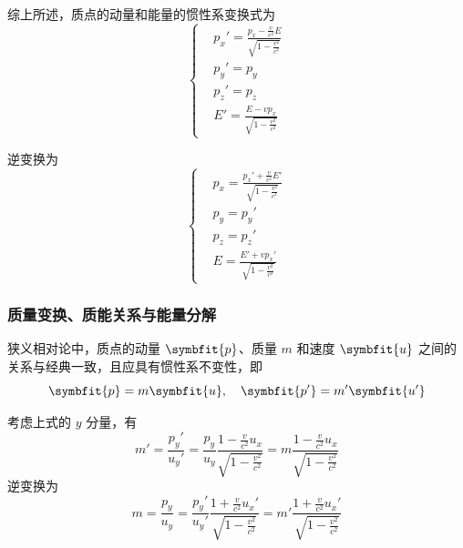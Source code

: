 综上所述，质点的动量和能量的惯性系变换式为
\begin{equation}
    \left\{
    \begin{aligned}
         & p_x' = \frac{p_x - \frac{v}{c^2} E}{\sqrt{1 - \frac{v^2}{c^2}}} \\
         & p_y' = p_y                                                      \\
         & p_z' = p_z                                                      \\
         & E' = \frac{E - v p_x}{\sqrt{1 - \frac{v^2}{c^2}}}
    \end{aligned}
    \right.
\end{equation}

逆变换为
\begin{equation}
    \left\{
    \begin{aligned}
         & p_x = \frac{p_x' + \frac{v}{c^2} E'}{\sqrt{1 - \frac{v^2}{c^2}}} \\
         & p_y = p_y'                                                       \\
         & p_z = p_z'                                                       \\
         & E = \frac{E' + v p_x'}{\sqrt{1 - \frac{v^2}{c^2}}}
    \end{aligned}
    \right.
\end{equation}

\subsubsection{质量变换、质能关系与能量分解}

狭义相对论中，质点的动量 $\symbfit{p}$、质量 $m$ 和速度 $\symbfit{u}$ 之间的关系与经典一致，且应具有惯性系不变性，即
\begin{equation}
    \symbfit{p} = m \symbfit{u}, \quad \symbfit{p'} = m' \symbfit{u'}
\end{equation}

考虑上式的 $y$ 分量，有
\begin{equation}
    m' = \frac{p_y'}{u_y'} = \frac{p_y}{u_y} \frac{1 - \frac{v}{c^2} u_x}{\sqrt{1 - \frac{v^2}{c^2}}} = m \frac{1 - \frac{v}{c^2} u_x}{\sqrt{1 - \frac{v^2}{c^2}}}
\end{equation}
逆变换为
\begin{equation}
    m = \frac{p_y}{u_y} = \frac{p_y'}{u_y'} \frac{1 + \frac{v}{c^2} u_x'}{\sqrt{1 - \frac{v^2}{c^2}}} = m' \frac{1 + \frac{v}{c^2} u_x'}{\sqrt{1 - \frac{v^2}{c^2}}}
\end{equation}

